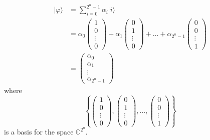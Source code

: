 \begin{equation*}
	\begin{split}
		\vert \varphi \rangle &= \sum_{i=0}^{2^n-1} \alpha_i \vert i \rangle\\
		&=\alpha_0 
			\begin{pmatrix}
				1\\
				0\\
				\vdots\\
				0
			\end{pmatrix}
			+
			\alpha_1 
			\begin{pmatrix}
				0\\
				1\\
				\vdots\\
				0
			\end{pmatrix}
			+ \ldots +
			\alpha_{2^n-1} 
			\begin{pmatrix}
				0\\
				0\\
				\vdots\\
				1
			\end{pmatrix}\\
		&=\begin{pmatrix}
				\alpha_0\\
				\alpha_1\\
				\vdots\\
				\alpha_{2^n-1}
			\end{pmatrix}
	\end{split}
\end{equation*}
where
\[
	\left\{ 
		\begin{pmatrix}
			1\\
			0\\
			\vdots\\
			0
		\end{pmatrix},
		\begin{pmatrix}
			0\\
			1\\
			\vdots\\
			0
		\end{pmatrix},
		\ldots,
		\begin{pmatrix}
			0\\
			0\\
			\vdots\\
			1
		\end{pmatrix}
	\right\}
\]
is a basis for the space $\mathbb{C}^{2^n}$.

